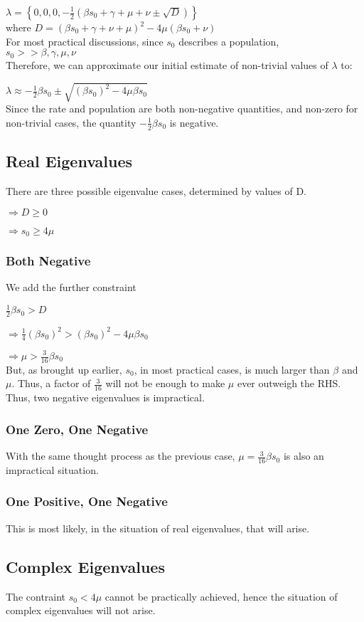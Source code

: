 \documentclass{article}
\begin{document}
$\lambda = \left\{ 0, 0, 0, -\frac{1}{2} \left( \beta s_0 + \gamma + \mu + \nu \pm \sqrt{D} \right) \right\} $ \\
where $D = \left( \beta s_0 + \gamma + \nu + \mu \right)^2 - 4\mu(\beta s_0 + \nu) $ \\
For most practical discussions, since $s_0$ describes a population, \\
$s_0 >> \beta, \gamma, \mu, \nu$ \\
Therefore, we can approximate our initial estimate of non-trivial values of $\lambda$ to:

$\lambda \approx -\frac{1}{2}\beta s_0 \pm \sqrt{\left( \beta s_0 \right)^2 - 4\mu \beta s_0}$ \\
Since the rate and population are both non-negative quantities, and non-zero for non-trivial cases,
the quantity $-\frac{1}{2}\beta s_0$ is negative. \\

\subsection{Real Eigenvalues}
There are three possible eigenvalue cases, determined by values of D.

$\Rightarrow D \geq 0$ 

$\Rightarrow s_0 \geq 4\mu$

\subsubsection{Both Negative}
We add the further constraint 

$\frac{1}{2} \beta s_0 > D$ 

$\Rightarrow \frac{1}{4} \left( \beta s_0 \right)^2 > \left( \beta s_0 \right)^2 - 4\mu \beta s_0$

$\Rightarrow \mu > \frac{3}{16} \beta s_0$ \\
But, as brought up earlier, $s_0$, in most practical cases, 
is much larger than $\beta$ and $\mu$. Thus, a factor of $\frac{3}{16}$ will not be enough to make $\mu$ ever outweigh the RHS.
Thus, two negative eigenvalues is impractical.

\subsubsection{One Zero, One Negative}
With the same thought process as the previous case, 
$\mu = \frac{3}{16} \beta s_0$ is also an impractical situation.

\subsubsection{One Positive, One Negative}
This is most likely, in the situation of real eigenvalues, that will arise.

\subsection{Complex Eigenvalues}
The contraint $s_0 < 4\mu$ cannot be practically achieved, 
hence the situation of complex eigenvalues will not arise. 
\end{document}
